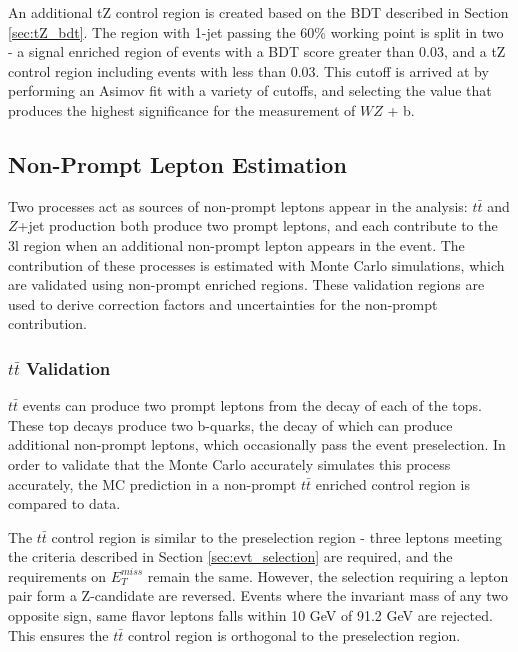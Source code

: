 An additional tZ control region is created based on the BDT described in Section \ref{sec:tZ_bdt}. The region with 1-jet passing the 60\% working point is split in two - a signal enriched region of events with a BDT score greater than 0.03, and a tZ control region including events with less than 0.03. This cutoff is arrived at by performing an Asimov fit with a variety of cutoffs, and selecting the value that produces the highest significance for the measurement of $WZ$ + b.

\subsection{Non-Prompt Lepton Estimation}
\label{sec:fakes}

Two processes act as sources of non-prompt leptons appear in the analysis: $t\bar{t}$ and $Z$+jet production both produce two prompt leptons, and each contribute to the 3l region when an additional non-prompt lepton appears in the event. The contribution of these processes is estimated with Monte Carlo simulations, which are validated using non-prompt enriched regions. These validation regions are used to derive correction factors and uncertainties for the non-prompt contribution.

\subsubsection{$t\bar{t}$ Validation}

$t\bar{t}$ events can produce two prompt leptons from the decay of each of the tops. These top decays produce two b-quarks, the decay of which can produce additional non-prompt leptons, which occasionally pass the event preselection. In order to validate that the Monte Carlo accurately simulates this process accurately, the MC prediction in a non-prompt $t\bar{t}$ enriched control region is compared to data.

The $t\bar{t}$ control region is similar to the preselection region - three leptons meeting the criteria described in Section \ref{sec:evt_selection} are required, and the requirements on $E_T^{miss}$ remain the same. However, the selection requiring a lepton pair form a Z-candidate are reversed. Events where the invariant mass of any two opposite sign, same flavor leptons falls within 10 GeV of 91.2 GeV are rejected. This ensures the $t\bar{t}$ control region is orthogonal to the preselection region. 

